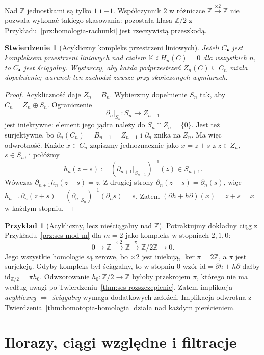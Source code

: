 \documentclass[11pt,a4paper,oneside]{report}
\newcommand{\Z}{\mathbb{Z}}
\newcommand{\id}{\mathrm{id}}
\theoremstyle{plain}
\newtheorem{stwierdzenie}[twierdzenie]{Stwierdzenie}
\theoremstyle{definition}
\newtheorem{przyklad}[twierdzenie]{Przykład}
\theoremstyle{remark}
\begin{document}
Nad $\Z$ jednostkami są tylko $1$ i $-1$.
Współczynnik $2$ w różniczce
$\Z\xrightarrow{\times2}\Z$ nie pozwala
wykonać takiego skasowania: pozostała
klasa $\Z/2$ z
Przykładu~\ref{prz:homologia-rachunki}
jest rzeczywistą przeszkodą.

\begin{stwierdzenie}[Acykliczny kompleks przestrzeni liniowych]
\label{prop:acykliczny-sciagalny}
Jeżeli $C_\bullet$ jest kompleksem
przestrzeni liniowych nad ciałem
$\mathbb K$ i $H_n(C)=0$ dla wszystkich
$n$, to $C_\bullet$ jest ściągalny.
Wystarczy, aby każda podprzestrzeń
$Z_n(C)\subseteq C_n$ miała dopełnienie;
warunek ten zachodzi zawsze przy
skończonych wymiarach.
\end{stwierdzenie}
\begin{proof}
Acykliczność daje $Z_n=B_n$.
Wybierzmy dopełnienie $S_n$ tak, aby
$C_n=Z_n\oplus S_n$. Ograniczenie
\[
 \partial_n|_{S_n}:S_n\longrightarrow Z_{n-1}
\]
jest iniektywne: element jego jądra
należy do $S_n\cap Z_n=\{0\}$.
Jest też surjektywne, bo
$\partial_n(C_n)=B_{n-1}=Z_{n-1}$
i $\partial_n$ znika na $Z_n$.
Ma więc odwrotność.
Każde $x\in C_n$ zapiszmy
jednoznacznie jako $x=z+s$
z $z\in Z_n$, $s\in S_n$, i połóżmy
\[
 h_n(z+s)
 :=(\partial_{n+1}|_{S_{n+1}})^{-1}(z)
 \in S_{n+1}.
\]
Wówczas $\partial_{n+1}h_n(z+s)=z$.
Z drugiej strony $\partial_n(z+s)=\partial_n(s)$,
więc
$h_{n-1}\partial_n(z+s)
=(\partial_n|_{S_n})^{-1}(\partial_ns)=s$.
Zatem $(\partial h+h\partial)(x)=z+s=x$
w każdym stopniu.
\end{proof}

\begin{przyklad}[Acykliczny, lecz nieściągalny nad $\Z$]
\label{prz:acykliczny-niesciagalny}
Potraktujmy dokładny ciąg z
Przykładu~\ref{prz:ses-mod-m} dla $m=2$
jako kompleks w stopniach $2,1,0$:
\[
 0\longrightarrow\Z\xrightarrow{\ \times2\ }\Z
 \xrightarrow{\ \pi\ }\Z/2\Z\longrightarrow0.
\]
Jego wszystkie homologie są zerowe,
bo $\times2$ jest iniekcją,
$\ker\pi=2\Z$, a $\pi$ jest
surjekcją. Gdyby kompleks był
ściągalny, to w stopniu $0$
wzór $\id=\partial h+h\partial$ dałby
$\id_{\Z/2}=\pi h_0$.
Odwzorowanie $h_0:\Z/2\to\Z$ byłoby
przekrojem $\pi$, którego
nie ma według uwagi po
Twierdzeniu~\ref{thm:ses-rozszczepienie}.
Zatem implikacja \emph{acykliczny
$\Rightarrow$ ściągalny} wymaga
dodatkowych założeń. Implikacja
odwrotna z
Twierdzenia~\ref{thm:homotopia-homologia}
działa nad każdym pierścieniem.
\end{przyklad}

\section{Ilorazy, ciągi względne i filtracje}
\label{sec:iloraz-filtracja}
\end{document}
